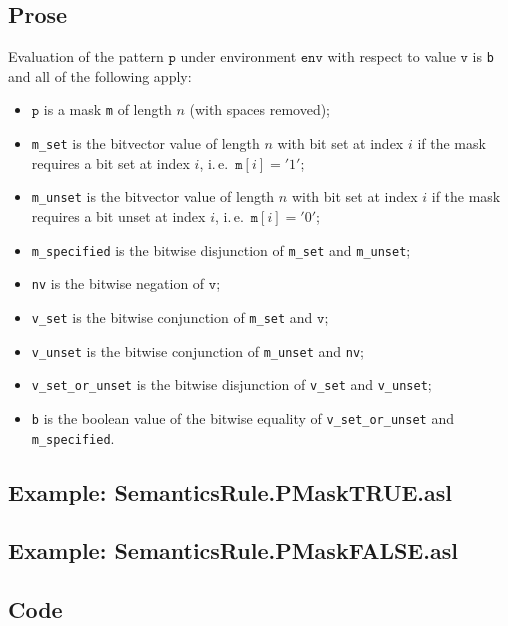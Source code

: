 \documentclass{book}
\newcommand\env[0]{\texttt{env}}
\newcommand\vp[0]{\texttt{p}}
\newcommand\vv[0]{\texttt{v}}
\begin{document}
    \subsection{Prose}
    Evaluation of the pattern $\vp$ under environment $\env$ with
    respect to value $\vv$ is \texttt{b} and all of the following apply:
    \begin{itemize}
      \item $\vp$ is a mask \texttt{m} of length $n$ (with spaces removed);
      \item \texttt{m\_set} is the bitvector value of length $n$ with bit set
        at index $i$ if the mask requires a bit set at index $i$, i.\,e.\
        $\texttt{m}[i] = '1'$;
      \item \texttt{m\_unset} is the bitvector value of length $n$ with bit set
        at index $i$ if the mask requires a bit unset at index $i$, i.\,e.\
        $\texttt{m}[i] = '0'$;
      \item \texttt{m\_specified} is the bitwise disjunction of \texttt{m\_set}
        and \texttt{m\_unset};
      \item \texttt{nv} is the bitwise negation of $\vv$;
      \item \texttt{v\_set} is the bitwise conjunction of \texttt{m\_set} and
        $\vv$;
      \item \texttt{v\_unset} is the bitwise conjunction of \texttt{m\_unset} and
        \texttt{nv};
      \item \texttt{v\_set\_or\_unset} is the bitwise disjunction of
        \texttt{v\_set} and \texttt{v\_unset};
      \item \texttt{b} is the boolean value of the bitwise equality of
        \texttt{v\_set\_or\_unset} and \texttt{m\_specified}.
    \end{itemize}

    \subsection{Example: SemanticsRule.PMaskTRUE.asl}

    \subsection{Example: SemanticsRule.PMaskFALSE.asl}

  \subsection{Code}
\end{document}
